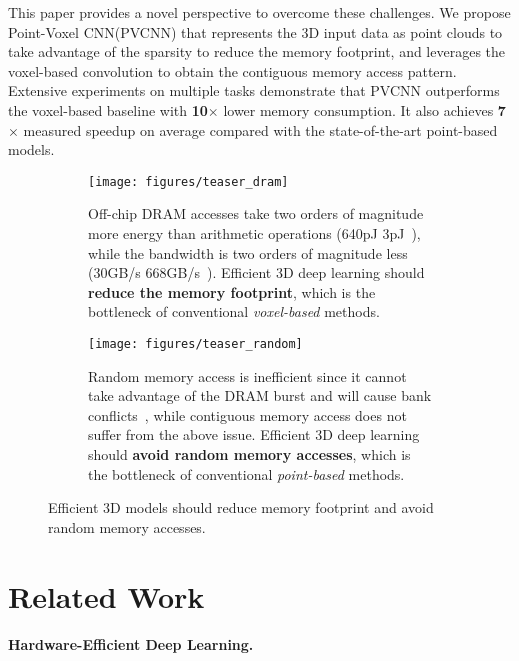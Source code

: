 \documentclass{article}
\def\model{Point-Voxel CNN\xspace}
\def\modelshort{PVCNN\xspace}
\begin{document}
This paper provides a novel perspective to overcome these challenges. We propose \model (\modelshort) that represents the 3D input data as point clouds to take advantage of the sparsity to reduce the memory footprint, and leverages the voxel-based convolution to obtain the contiguous memory access pattern. Extensive experiments on multiple tasks demonstrate that \modelshort outperforms the voxel-based baseline with \textbf{10$\times$} lower memory consumption. It also achieves \textbf{7$\times$} measured speedup on average compared with the state-of-the-art point-based models.

\begin{figure}[t]
\centering
\begin{subfigure}[b]{0.49\textwidth}
    \centering
    \texttt{[image: figures/teaser\_dram]}
    \caption{Off-chip DRAM accesses take two orders of magnitude more energy than arithmetic operations (640pJ \vs 3pJ~\cite{Horowitz:2014co}), while the bandwidth is two orders of magnitude less (30GB/s \vs 668GB/s~\cite{Jouppi:2017da}). Efficient 3D deep learning should \textbf{reduce the memory footprint}, which is the bottleneck of conventional \textit{voxel-based} methods.}
    \label{fig:teaser:a}
\end{subfigure}
\hfill
\begin{subfigure}[b]{0.49\textwidth}
    \centering
    \texttt{[image: figures/teaser\_random]}
    \caption{Random memory access is inefficient since it cannot take advantage of the DRAM burst and will cause bank conflicts~\cite{DDR}, while contiguous memory access does not suffer from the above issue. Efficient 3D deep learning should \textbf{avoid random memory accesses}, which is the bottleneck of  conventional \textit{point-based} methods.}
    \label{fig:teaser:b}
\end{subfigure}
\caption{Efficient 3D models should reduce memory footprint and avoid random memory accesses.}
\label{fig:teaser}
\vspace{-10pt}
\end{figure}
  \section{Related Work}

\paragraph{Hardware-Efficient Deep Learning.} 
\end{document}
